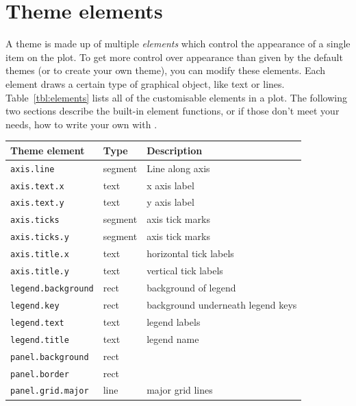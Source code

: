 \section{Theme elements}
\label{sec:theme_elements}

A theme is made up of multiple \emph{elements} which control the appearance of a single item on the plot.  To get more control over appearance than given by the default themes (or to create your own theme), you can modify these elements.  Each element draws a certain type of graphical object, like text or lines. Table~\ref{tbl:elements} lists all of the customisable elements in a plot. The following two sections describe the built-in element functions, or if those don't meet your needs, how to write your own with .


\begin{table}
  \begin{center}
  \begin{tabular}{lll}\\
    \toprule
    Theme element              & Type     & Description  \\
    \midrule                              
    \texttt{axis.line}         & segment  & Line along axis  \\
    \texttt{axis.text.x}       & text     & x axis label  \\
    \texttt{axis.text.y}       & text     & y axis label  \\
    \texttt{axis.ticks}        & segment  & axis tick marks  \\
    \texttt{axis.ticks.y}      & segment  & axis tick marks  \\
    \texttt{axis.title.x}      & text     & horizontal tick labels  \\
    \texttt{axis.title.y}      & text     & vertical tick labels  \\[0.5em]
    \texttt{legend.background} & rect     & background of legend  \\
    \texttt{legend.key}        & rect     & background underneath legend keys \\
    \texttt{legend.text}       & text     & legend labels  \\
    \texttt{legend.title}      & text     & legend name  \\[0.5em]
    \texttt{panel.background}  & rect     &   \\
    \texttt{panel.border}      & rect     &   \\
    \texttt{panel.grid.major}  & line     & major grid lines \\

\end{tabular}
\end{center}
\end{table}
